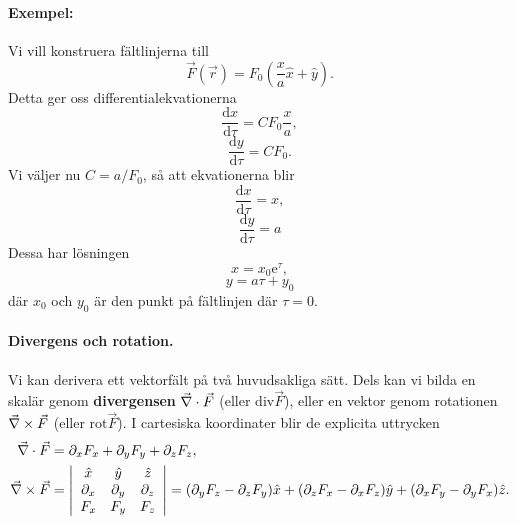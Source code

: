 \documentclass[%
oneside,                 %
final,                   %
10pt]{article}
\begin{document}
\paragraph{Exempel:}
Vi vill konstruera fältlinjerna till 
\begin{equation}
  \vec{F}\left(\vec{r}\right) = F_0\left(\frac{x}{a} \hat{x} + 
\hat{y}\right).
\end{equation}
Detta ger oss differentialekvationerna
\begin{equation}
  \frac{\mbox{d}x}{\mbox{d}\tau} = CF_0 \frac{x}{a},
\end{equation}
\begin{equation}
  \frac{\mbox{d}y}{\mbox{d}\tau} = C F_0.
\end{equation}
Vi väljer nu $C = a/F_0$, så att ekvationerna blir
\begin{equation}
  \frac{\mbox{d}x}{\mbox{d}\tau} = x,
\end{equation}
\begin{equation}
  \frac{\mbox{d}y}{\mbox{d}\tau} = a
\end{equation}
Dessa har lösningen
\begin{equation}
  x = x_0 \mbox{e}^\tau,
\end{equation}
\begin{equation}
  y = a \tau + y_0
\end{equation}
där $x_0$ och $y_0$ är den punkt på fältlinjen där $\tau = 0$.

\paragraph{Divergens och rotation.}
Vi kan derivera ett vektorfält på två huvudsakliga sätt. Dels kan vi bilda en skalär genom \textbf{divergensen} $\vec{\nabla} \cdot \vec{F}$ (eller $\mathrm{div} \vec{F}$), eller en vektor genom rotationen $\vec{\nabla} \times \vec{F}$ (eller $\mathrm{rot} \vec{F}$). I cartesiska koordinater blir de explicita uttrycken
\begin{align}
\vec{\nabla} \cdot \vec{F} &= \partial_x F_x + \partial_y F_y + \partial_z F_z, \\ 
\vec{\nabla} \times \vec{F} & = \left| 
\begin{array}{ccc}
\hat{x} & \hat{y} & \hat{z} \\ 
\partial_{x} & \partial_{y} & \partial_{z} \\ 
F_x & F_y & F_z
\end{array}
\right|
= (\partial_y F_z - \partial_z F_y)\hat{x} + (\partial_z F_x - \partial_x F_z)\hat{y} + (\partial_x F_y - \partial_y F_x) \hat{z}.
\end{align}
\end{document}
